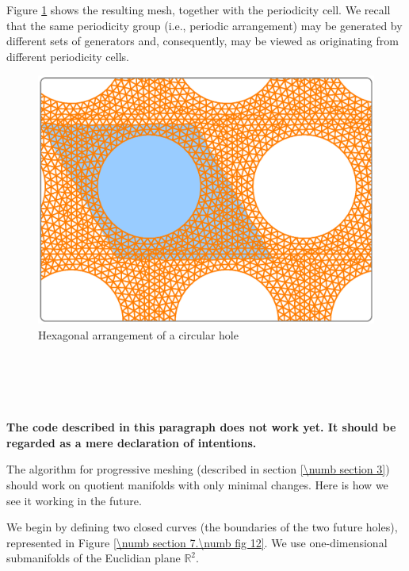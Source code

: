 Figure \ref{\numb section 7.\numb fig 11} shows the resulting mesh, together with the
periodicity cell.
We recall that the same periodicity group (i.e., periodic arrangement) may be generated
by different sets of generators and, consequently, may be viewed as originating
from different periodicity cells.

\begin{figure}[ht] \centering
  \includegraphics[width=130mm]{hexa-round-hole.eps}
  \caption{Hexagonal arrangement of a circular hole}
  \label{\numb section 7.\numb fig 11}
\end{figure}


\section{~~}
\label{\numb section 7.\numb parag 17}

{\normalfont\bfseries The code described in this paragraph does not work yet.
It should be regarded as a mere declaration of intentions.}
\medskip


The algorithm for progressive meshing (described in section \ref{\numb section 3})
should work on quotient manifolds with only minimal changes.
Here is how we see it working in the future.

We begin by defining two closed curves (the boundaries of the two future holes),
represented in Figure \ref{\numb section 7.\numb fig 12}.
We use one-dimensional submanifolds of the Euclidian plane $ \mathbb{R}^2 $.


